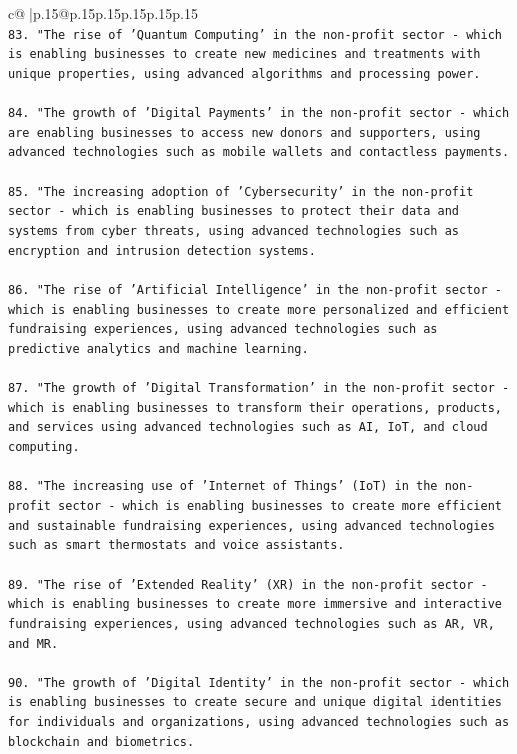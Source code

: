\documentclass{article}
\begin{document}
{\begin{supertabular}{c@{$\;$}|p{.15\linewidth}@{}p{.15\linewidth}p{.15\linewidth}p{.15\linewidth}p{.15\linewidth}p{.15\linewidth}}
{{{\\ 
\texttt{83. "The rise of 'Quantum Computing' in the non{-}profit sector {-} which is enabling businesses to create new medicines and treatments with unique properties, using advanced algorithms and processing power.} \\
\\ 
\texttt{84. "The growth of 'Digital Payments' in the non{-}profit sector {-} which are enabling businesses to access new donors and supporters, using advanced technologies such as mobile wallets and contactless payments.} \\
\\ 
\texttt{85. "The increasing adoption of 'Cybersecurity' in the non{-}profit sector {-} which is enabling businesses to protect their data and systems from cyber threats, using advanced technologies such as encryption and intrusion detection systems.} \\
\\ 
\texttt{86. "The rise of 'Artificial Intelligence' in the non{-}profit sector {-} which is enabling businesses to create more personalized and efficient fundraising experiences, using advanced technologies such as predictive analytics and machine learning.} \\
\\ 
\texttt{87. "The growth of 'Digital Transformation' in the non{-}profit sector {-} which is enabling businesses to transform their operations, products, and services using advanced technologies such as AI, IoT, and cloud computing.} \\
\\ 
\texttt{88. "The increasing use of 'Internet of Things' (IoT) in the non{-}profit sector {-} which is enabling businesses to create more efficient and sustainable fundraising experiences, using advanced technologies such as smart thermostats and voice assistants.} \\
\\ 
\texttt{89. "The rise of 'Extended Reality' (XR) in the non{-}profit sector {-} which is enabling businesses to create more immersive and interactive fundraising experiences, using advanced technologies such as AR, VR, and MR.} \\
\\ 
\texttt{90. "The growth of 'Digital Identity' in the non{-}profit sector {-} which is enabling businesses to create secure and unique digital identities for individuals and organizations, using advanced technologies such as blockchain and biometrics.} \\
}}}
\end{supertabular}}
\end{document}
